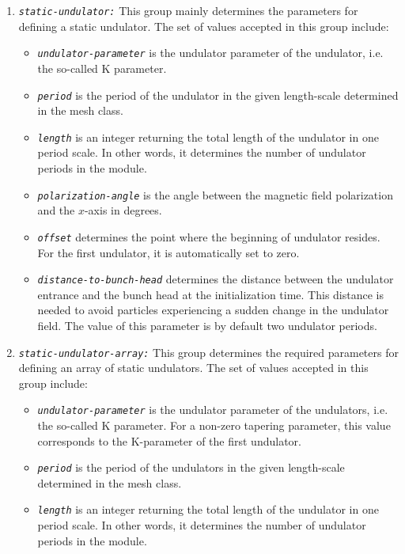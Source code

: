 \begin{enumerate}
%
\item {\tt \small \em static-undulator:} This group mainly determines the parameters for defining a static undulator. The set of values accepted in this group include:
%
\begin{itemize}
	\item {\tt \small \em undulator-parameter} is the undulator parameter of the undulator, i.e. the so-called K parameter.
	\item {\tt \small \em period} is the period of the undulator in the given length-scale determined in the mesh class.
	\item {\tt \small \em length} is an integer returning the total length of the undulator in one period scale. In other words, it determines the number of undulator periods in the module.
    \item {\tt \small \em polarization-angle} is the angle between the magnetic field polarization and the $x$-axis in degrees.
    \item {\tt \small \em offset} determines the point where the beginning of undulator resides. For the first undulator, it is automatically set to zero.
    \item {\tt \small \em distance-to-bunch-head} determines the distance between the undulator entrance and the bunch head at the initialization time. This distance is needed to avoid particles experiencing a sudden change in the undulator field. The value of this parameter is by default two undulator periods.
\end{itemize}
%
\item {\tt \small \em static-undulator-array:} This group determines the required parameters for defining an array of static undulators. The set of values accepted in this group include:
%
\begin{itemize}
	\item {\tt \small \em undulator-parameter} is the undulator parameter of the undulators, i.e. the so-called K parameter. For a non-zero tapering parameter, this value corresponds to the K-parameter of the first undulator.
	\item {\tt \small \em period} is the period of the undulators in the given length-scale determined in the mesh class.
	\item {\tt \small \em length} is an integer returning the total length of the undulator in one period scale. In other words, it determines the number of undulator periods in the module.

\end{itemize}
\end{enumerate}
